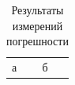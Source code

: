 \begin{table}
  \caption{Результаты измерений погрешности}
  \label{tab:results}
  \begin{tabular}{ll}
    а & б \\
  \end{tabular}
\end{table}
